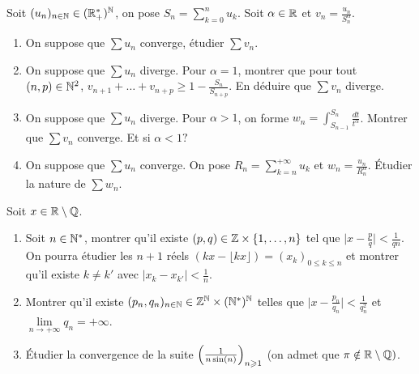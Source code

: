 \begin{exercise}
	Soit $(u_{n})_{n\in\mathbb{N}}\in(\mathbb{R}_{+}^{*})^{\mathbb{N}}$, on pose
	$S_{n}=\sum_{k=0}^{n}u_{k}$. Soit $\alpha\in\mathbb{R}$ et
	$v_{n}=\frac{u_{n}}{S_{n}^{\alpha}}$.
	\begin{enumerate}
		\item
		On suppose que $\sum u_{n}$ converge, étudier $\sum v_{n}$.
		\item
		On suppose que $\sum u_{n}$ diverge. Pour $\alpha=1$, montrer que pour
		tout $(n,p)\in\mathbb{N}^{2}$, $v_{n+1}+\dots+v_{n+p}\geqslant
		1-\frac{S_{n}}{S_{n+p}}$. En déduire que $\sum v_{n}$ diverge.
		\item
		On suppose que $\sum u_{n}$ diverge. Pour $\alpha>1$, on forme
		$w_{n}=\int_{S_{n-1}}^{S_{n}}\frac{dt}{t^{\alpha}}$. Montrer que $\sum
		v_{n}$ converge. Et si $\alpha<1?$
		\item
		On suppose que $\sum u_{n}$ converge. On pose
		$R_{n}=\sum_{k=n}^{+\infty}u_{k}$ et $w_{n}=\frac{u_{n}}{R_{n}^{\alpha}}$.
		Étudier la nature de $\sum w_{n}$.
	\end{enumerate}
\end{exercise}

\begin{exercise}
	Soit $x\in\mathbb{R}\setminus\mathbb{Q}$.
	\begin{enumerate}
		\item
		Soit $n\in\mathbb{N}^{*}$, montrer qu'il existe $(p,q)\in\mathbb{Z}\times\{1,\dots,n\}$
		tel que $\bigl\vert x-\frac{p}{q}\bigr\vert<\frac{1}{qn}$. On pourra
		étudier les $n+1$ réels $(kx-\lfloor kx\rfloor)=(x_{k})_{0\leqslant
		k\leqslant n}$ et montrer qu'il existe $k\neq k'$ avec $\vert
		x_{k}-x_{k'}\vert<\frac{1}{n}$.
		\item
		Montrer qu'il existe $(p_{n},q_{n})_{n\in\mathbb{N}}\in\mathbb{Z}^{\mathbb{N}}\times(\mathbb{N}^{*})^{\mathbb{N}}$
		telles que $\bigl\vert
		x-\frac{p_{n}}{q_{n}}\bigr\vert<\frac{1}{q_{n}^{2}}$ et
		$\lim\limits_{n\to+\infty}q_{n}=+\infty$.
		\item
		Étudier la convergence de la suite
		$\Bigl(\frac{1}{n\sin(n)}\Bigr)_{n\geqslant1}$ (on admet que
		$\pi\notin\mathbb{R}\setminus\mathbb{Q})$.
	\end{enumerate}
\end{exercise}

